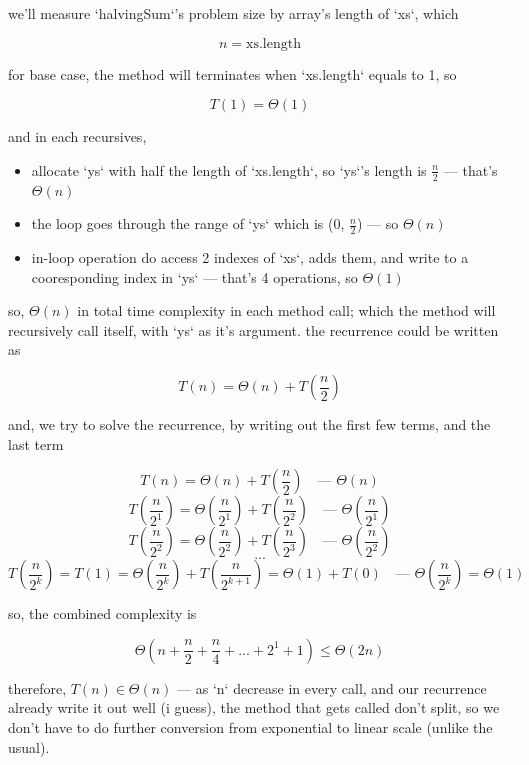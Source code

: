 \documentclass{article}
\theoremstyle{remark}
\begin{document}
\begin{enumerate*}
    \item we'll measure `halvingSum`'s problem size by array's length of `xs`, which

        \[\boxed{n = \text{xs.length}}\]

        for base case, the method will terminates when `xs.length` equals to 1, so 

        \[T(1) = \Theta(1)\]

        and in each recursives, 

        \begin{itemize}
            \item allocate `ys` with half the length of `xs.length`, so `ys`'s length is $\frac{n}{2}$ --- that's $\Theta(n)$
            \item the loop goes through the range of `ys` which is (0, $\frac{n}{2}$) --- so $\Theta(n)$
            \item in-loop operation do access 2 indexes of `xs`, adds them, and write to a cooresponding index in `ys` --- that's 4 operations, so $\Theta(1)$
        \end{itemize}

        so, $\Theta(n)$ in total time complexity in each method call; which the method will recursively call itself, with `ys` as it's argument. the recurrence could be written as

        \[\boxed{T(n) = \Theta(n) + T(\frac{n}{2})}\]

        and, we try to solve the recurrence, by writing out the first few terms, and the last term

        \[T(n) = \Theta(n) + T(\frac{n}{2}) \quad \text{--- } \Theta(n)\]
        \[T(\frac{n}{2^1}) = \Theta(\frac{n}{2^1}) + T(\frac{n}{2^2}) \quad \text{--- } \Theta(\frac{n}{2^1})\]
        \[T(\frac{n}{2^2}) = \Theta(\frac{n}{2^2}) + T(\frac{n}{2^3}) \quad \text{--- } \Theta(\frac{n}{2^2})\]
        \[...\]
        \[T(\frac{n}{2^k}) = T(1) = \Theta(\frac{n}{2^k}) + T(\frac{n}{2^{k+1}}) = \Theta(1) + T(0) \quad \text{--- } \Theta(\frac{n}{2^k}) = \Theta(1)\]

        so, the combined complexity is

        \[\Theta(n + \frac{n}{2} + \frac{n}{4} + ... + 2^1 + 1) \le \Theta(2n)\]

        therefore, $\boxed{T(n) \in \Theta(n)}$ --- as `n` decrease in every call, and our recurrence already write it out well (i guess), the method that gets called don't split, so we don't have to do further conversion from exponential to linear scale (unlike the usual).


\end{enumerate*}
\end{document}

